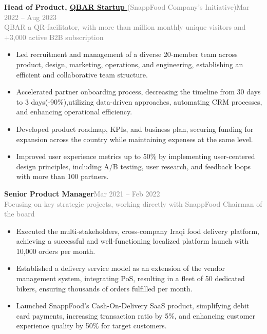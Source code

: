 \documentclass[a4paper,10.9pt]{article}
\newcommand{\position}[1]{\Large\bfseries #1}\vspace{0.2em}
\newcommand{\bulletitem}[1]{\item #1\vspace{0.1em}}
\newcommand{\graytext}[1]{\textcolor{grey}{#1}} %
\begin{document}
\begin{adjustwidth}{0.5cm}{0cm}

{{\position{Head of Product, }\large{\href{https://qbar.ir/container}{QBAR Startup \faExternalLink{} }}}{\small{\graytext{(SnappFood Company’s Initiative)}}}\hfill \large\graytext{Mar 2022 – Aug 2023}}
\\
{\small\graytext{QBAR a QR-facilitator, with more than million monthly unique visitors and +3,000 active B2B subscription}}
\begin{adjustwidth}{0.5cm}{0cm}
\normalsize
\begin{itemize}
  \bulletitem{Led recruitment and management of a diverse 20-member team across product, design, marketing, operations, and engineering, establishing an efficient and collaborative team structure.}
  \bulletitem{Accelerated partner onboarding process, decreasing the timeline from 30 days to 3 days(-90\%),utilizing data-driven approaches, automating CRM processes, and enhancing operational efficiency.}
  \bulletitem{Developed product roadmap, KPIs, and business plan, securing funding for expansion across the country while maintaining expenses at the same level.}
  \bulletitem{Improved user experience metrics up to 50\% by implementing user-centered design principles, including A/B testing, user research, and feedback loops with more than 100 partners.}
\end{itemize}
\end{adjustwidth}
\vspace{3pt}

{{\position{Senior Product Manager}}\hfill {\large\graytext{Mar 2021 – Feb 2022}}}
\\
{\small\graytext{Focusing on key strategic projects, working directly with SnappFood Chairman of the board}}
\normalsize
\begin{adjustwidth}{0.5cm}{0cm}
\begin{itemize}
  \bulletitem{Executed the multi-stakeholders, cross-company Iraqi food delivery platform, achieving a successful and well-functioning localized platform launch with 10,000 orders per month.}
  \bulletitem{Established a delivery service model as an extension of the vendor management system, integrating PoS, resulting in a fleet of 50 dedicated bikers, ensuring thousands of orders fulfilled per month.}
  \bulletitem{Launched SnappFood’s Cash-On-Delivery SaaS product, simplifying debit card payments, increasing transaction ratio by 5\%, and enhancing customer experience quality by 50\% for target customers.}
\end{itemize}
\end{adjustwidth}
\vspace{3pt}


\end{adjustwidth}
\end{document}

